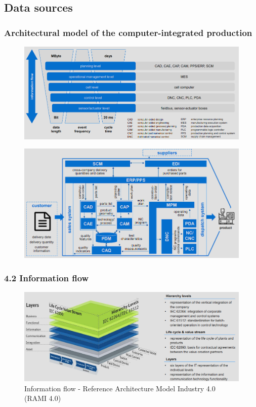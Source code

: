 \documentclass[12pt, a4paper, oneside, justified]{article}
\begin{document}
\subsection{Data sources}

\subsubsection{Architectural model of the computer-integrated production}

\begin{figure}[htbp]
    \centering
    \includegraphics[scale=0.8]{../img/2-2.png}
    \label{img/2-2}
\end{figure}

\begin{figure}[htbp]
    \centering
    \includegraphics[scale=0.8]{../img/2-3.png}
    \label{img/2-3}
\end{figure}

\subsubsection{4.2 Information flow}

\begin{figure}[htbp]
    \centering
    \includegraphics[scale=0.8]{../img/2-4.png}
    \caption{Information flow - Reference Architecture Model Industry 4.0 (RAMI 4.0)}
    \label{img/2-4}
\end{figure}
\end{document}
